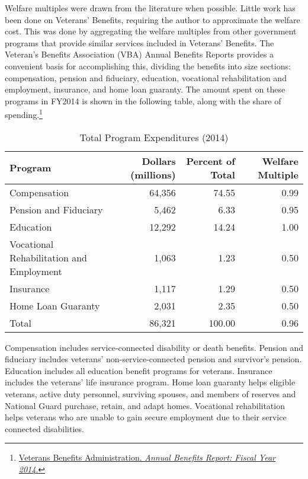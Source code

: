 \documentclass{article}
\begin{document}
Welfare multiples were drawn from the literature when possible. Little work has been done on Veterans' Benefits, requiring the author to approximate the welfare cost. This was done by aggregating the welfare multiples from other government programs that provide similar services included in Veterans' Benefits. The Veteran's Benefits Association (VBA) Annual Benefits Reports provides a convenient basis for accomplishing this, dividing the benefits into size sections: compensation, pension and fiduciary, education, vocational rehabilitation and employment, insurance, and home loan guaranty. The amount spent on these programs in FY2014 is shown in the following table, along with the share of spending.\footnote{\href{http://www.benefits.va.gov/REPORTS/abr/ABR-IntroAppendix-FY14-11032015.pdf}{Veterans Benefits Administration. \textit{Annual Benefits Report: Fiscal Year 2014}.}}

\begin{table}[H]
\caption{Total Program Expenditures (2014)}
\begin{center}
\begin{adjustbox}{max width=\textwidth}
\begin{tabular}{lrrr}
\toprule
Program 									&  Dollars (millions) 	& Percent of Total	&	Welfare Multiple 	\\
\midrule
Compensation 								&	64,356				& 74.55				&	0.99				\\		
Pension and Fiduciary 						&	5,462				& 6.33				&	0.95				\\
Education 									&	12,292				& 14.24				&	1.00				\\
Vocational Rehabilitation and Employment 	&	1,063				& 1.23				&	0.50				\\
Insurance									&	1,117				& 1.29				&	0.50				\\
Home Loan Guaranty 							& 	2,031				& 2.35				&	0.50				\\
Total 										& 	86,321				& 100.00			&	0.96				\\
\bottomrule
\end{tabular}
\end{adjustbox}
\end{center}
\end{table}

Compensation includes service-connected disability or death benefits. Pension and fiduciary includes veterans' non-service-connected pension and survivor's pension. Education includes all education benefit programs for veterans. Insurance includes the veterans' life insurance program. Home loan guaranty helps eligible veterans, active duty personnel, surviving spouses, and members of reserves and National Guard purchase, retain, and adapt homes. Vocational rehabilitation helps veterans who are unable to gain secure employment due to their service connected disabilities.
\end{document}
